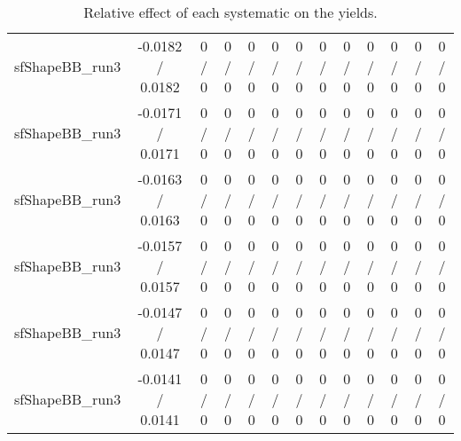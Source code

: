\documentclass[10pt]{article}
\begin{document}
\begin{table}[htbp]
\begin{center}
\begin{tabular}{|c|c|c|c|c|c|c|c|c|c|c|c|c|}
  sfShapeBB_run3 & -0.0182 / 0.0182 & 0 / 0 & 0 / 0 & 0 / 0 & 0 / 0 & 0 / 0 & 0 / 0 & 0 / 0 & 0 / 0 & 0 / 0 & 0 / 0 & 0 / 0 \\ 
  sfShapeBB_run3 & -0.0171 / 0.0171 & 0 / 0 & 0 / 0 & 0 / 0 & 0 / 0 & 0 / 0 & 0 / 0 & 0 / 0 & 0 / 0 & 0 / 0 & 0 / 0 & 0 / 0 \\ 
  sfShapeBB_run3 & -0.0163 / 0.0163 & 0 / 0 & 0 / 0 & 0 / 0 & 0 / 0 & 0 / 0 & 0 / 0 & 0 / 0 & 0 / 0 & 0 / 0 & 0 / 0 & 0 / 0 \\ 
  sfShapeBB_run3 & -0.0157 / 0.0157 & 0 / 0 & 0 / 0 & 0 / 0 & 0 / 0 & 0 / 0 & 0 / 0 & 0 / 0 & 0 / 0 & 0 / 0 & 0 / 0 & 0 / 0 \\ 
  sfShapeBB_run3 & -0.0147 / 0.0147 & 0 / 0 & 0 / 0 & 0 / 0 & 0 / 0 & 0 / 0 & 0 / 0 & 0 / 0 & 0 / 0 & 0 / 0 & 0 / 0 & 0 / 0 \\ 
  sfShapeBB_run3 & -0.0141 / 0.0141 & 0 / 0 & 0 / 0 & 0 / 0 & 0 / 0 & 0 / 0 & 0 / 0 & 0 / 0 & 0 / 0 & 0 / 0 & 0 / 0 & 0 / 0 \\ 
\hline 
\end{tabular} 
\caption{Relative effect of each systematic on the yields.} 
\end{center} 
\end{table} 
\end{document}
